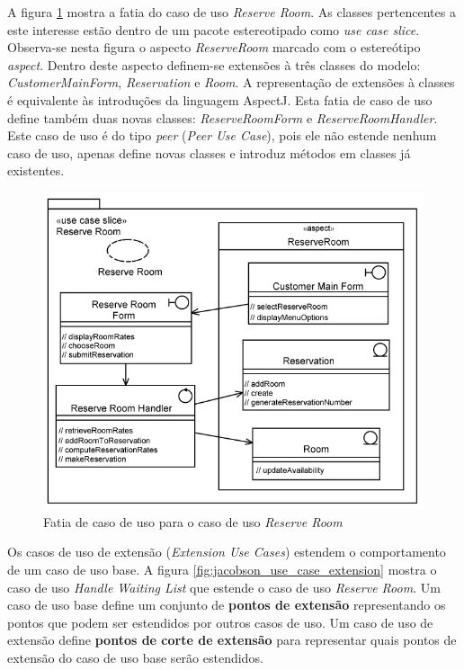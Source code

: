 A figura \ref{fig:jacobson_reserve_room_slice} mostra a fatia do caso de uso \textit{Reserve Room}. As classes pertencentes a este interesse
estão dentro de um pacote estereotipado como \textit{use case slice}. Observa-se nesta figura o aspecto \textit{ReserveRoom} marcado com o estereótipo
\textit{aspect}. Dentro deste aspecto definem-se extensões à três classes do modelo: \textit{CustomerMainForm}, \textit{Reservation} e \textit{Room}.
A representação de extensões à classes é equivalente às introduções da linguagem AspectJ. Esta fatia de caso de uso define também
duas novas classes: \textit{ReserveRoomForm} e \textit{ReserveRoomHandler}. Este caso de uso é do tipo \textit{peer} (\textit{Peer Use Case}), pois
ele não estende nenhum caso de uso, apenas define novas classes e introduz métodos em classes já existentes.

\begin{figure}
	\centering
	\includegraphics[width=450px]{img/jacobson_reserve_room_slice.png}
	\caption{Fatia de caso de uso para o
	caso de uso \textit{Reserve Room}}\label{fig:jacobson_reserve_room_slice}
\end{figure}

Os casos de uso de extensão (\textit{Extension Use Cases}) estendem o comportamento de um caso de uso base. A figura
\ref{fig:jacobson_use_case_extension} mostra o caso de uso \textit{Handle Waiting List} que estende o caso de uso \textit{Reserve Room}. Um caso de
uso base define um conjunto de \textbf{pontos de extensão} representando os pontos que podem ser estendidos por outros casos de uso. Um caso de uso de
extensão define \textbf{pontos de corte de extensão} para representar quais pontos de extensão do caso de uso base serão estendidos. 

